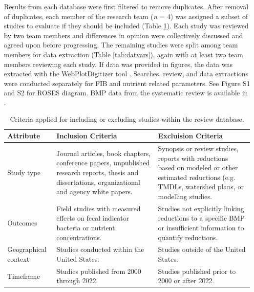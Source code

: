\documentclass[utf8]{FrontiersinHarvard}
\begin{document}
Results from each database were first filtered to remove duplicates.
After removal of duplicates, each member of the research team (\emph{n} = 4) was assigned a subset of studies to evaluate if they should be included (Table \ref{tab:criteria}).
Each study was reviewed by two team members and differences in opinion were collectively discussed and agreed upon before progressing.
The remaining studies were split among team members for data extraction (Table \ref{tab:datvars}), again with at least two team members reviewing each study.
If data was provided in figures, the data was extracted with the WebPlotDigitizer tool \citep{rohatgiWebPlotDigitizer2022}.
Searches, review, and data extractions were conducted separately for FIB and nutrient related parameters.
See Figure S1 and S2 for ROSES diagram. BMP data from the systematic review is available in \citet{kikoyoTWRINPSBMPDB2024}.

\begin{table}

\caption{\label{tab:criteria}Criteria applied for including or excluding studies within the review database.}
\centering
\begin{tabular}[t]{>{\raggedright\arraybackslash}p{5em}>{\raggedright\arraybackslash}p{15em}>{\raggedright\arraybackslash}p{15em}}
\toprule
Attribute & Inclusion Criteria & Excluision Criteria\\
\midrule
Study type & Journal articles, book chapters, conference papers, unpublished research reports, thesis and dissertations, organizational and agency white papers. & Synopsis or review studies, reports with reductions based on modeled or other estimated reductions (e.g. TMDLs, watershed plans, or modelling studies.\\
Outcomes & Field studies with measured effects on fecal indicator bacteria or nutrient concentrations. & Studies not explicitly linking reductions to a specific BMP or insufficient information to quantify reductions.\\
Geographical context & Studies conducted within the United States. & Studies outside of the United States.\\
Timeframe & Studies published from 2000 through 2022. & Studies published prior to 2000 or after 2022.\\
\bottomrule
\end{tabular}
\end{table}
\end{document}
